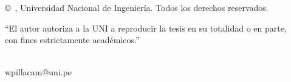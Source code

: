 \thispagestyle{empty}
\vspace*{4cm}

\begin{center}
\copyright\ \tesisAnio, Universidad Nacional de Ingeniería. Todos los derechos reservados.

\vspace{0.5cm}
``El autor autoriza a la UNI a reproducir la tesis en su totalidad o en parte,\\
con fines estrictamente académicos.''
\end{center}

\vspace{2cm}
\noindent \tesisAutor\\
wpillacam@uni.pe
